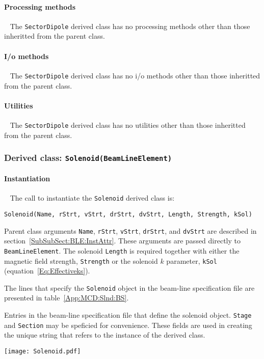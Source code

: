 \paragraph{Processing methods} ~\newline
\noindent
The \texttt{SectorDipole} derived class has no processing methods
other than those inheritted from the parent class.

\paragraph{I/o methods} ~\newline
\noindent
The \texttt{SectorDipole} derived class has no i/o methods other
than those inheritted from the parent class.

\paragraph{Utilities} ~\newline
\noindent
The \texttt{SectorDipole} derived class has no utilities other
than those inheritted from the parent class. 

\FloatBarrier

\subsubsection{Derived class: \texttt{Solenoid(BeamLineElement)}}

\paragraph{Instantiation} ~\newline
\noindent
The call to instantiate the \texttt{Solenoid} derived class is:
\begin{center}
  \texttt{Solenoid(Name, rStrt, vStrt, drStrt, dvStrt,
          Length, Strength, kSol)} 
\end{center}
Parent class arguments \texttt{Name}, \texttt{rStrt}, \texttt{vStrt},
\texttt{drStrt}, and \texttt{dvStrt} are described in
section~\ref{SubSubSect:BLE:InstAttr}.
These arguments are passed directly to \texttt{BeamLineElement}.
The solenoid \texttt{Length} is required together with either the
magnetic field strength, \texttt{Strength} or the solenoid $k$
parameter, \texttt{kSol} (equation~\ref{Eq:Effectiveks}).  

The lines that specify the \texttt{Solenoid} object in the
beam-line specification file are presented in
table~\ref{App:MCD:Slnd:BS}. 
\begin{table}[h]
  \caption{
    Entries in the beam-line specification file that define the
    solenoid object.
    \texttt{Stage} and \texttt{Section} may be speficied for
    convenience.
    These fields are used in creating the unique string that refers
    to the instance of the derived class.
  }
  \label{App:MCD:Slnd:BS}
  \begin{center}
    \texttt{[image: Solenoid.pdf]}
  \end{center}
\end{table}

